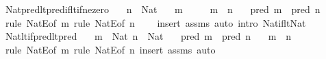 \begin{isabellebody}
\ Nat{\isacharunderscore}{\kern0pt}pred{\isacharunderscore}{\kern0pt}lt{\isacharunderscore}{\kern0pt}pred{\isacharunderscore}{\kern0pt}if{\isacharunderscore}{\kern0pt}lt{\isacharunderscore}{\kern0pt}if{\isacharunderscore}{\kern0pt}ne{\isacharunderscore}{\kern0pt}zero{\isacharcolon}{\kern0pt}\isanewline
\ \ \ {\isachardoublequoteopen}n\ {\isacharcolon}{\kern0pt}\ Nat{\isachardoublequoteclose}\isanewline
\ \ \ {\isachardoublequoteopen}m\ {\isasymnoteq}\ {}{\isachardoublequoteclose}\isanewline
\ \ \ {\isachardoublequoteopen}m\ {\isacharless}{\kern0pt}\ n{\isachardoublequoteclose}\isanewline
\ \ \ {\isachardoublequoteopen}pred\ m\ {\isacharless}{\kern0pt}\ pred\ n{\isachardoublequoteclose}\isanewline
%
\isadelimproof
\ \ %
\endisadelimproof
%
\isatagproof
{}\isamarkupfalse%
\ {\isacharparenleft}{\kern0pt}rule\ NatE{\isacharbrackleft}{\kern0pt}of\ m{\isacharbrackright}{\kern0pt}{\isacharsemicolon}{\kern0pt}\ rule\ NatE{\isacharbrackleft}{\kern0pt}of\ n{\isacharbrackright}{\kern0pt}{\isacharparenright}{\kern0pt}\isanewline
\ \ \ \ {\isacharparenleft}{\kern0pt}insert\ assms{\isacharcomma}{\kern0pt}\ auto\ intro{\isacharcolon}{\kern0pt}\ Nat{\isacharunderscore}{\kern0pt}if{\isacharunderscore}{\kern0pt}lt{\isacharunderscore}{\kern0pt}Nat{\isacharparenright}{\kern0pt}%
\endisatagproof
{\isafoldproof}%
%
\isadelimproof
\isanewline
%
\endisadelimproof
\isanewline
{}\isamarkupfalse%
\ Nat{\isacharunderscore}{\kern0pt}lt{\isacharunderscore}{\kern0pt}if{\isacharunderscore}{\kern0pt}pred{\isacharunderscore}{\kern0pt}lt{\isacharunderscore}{\kern0pt}pred{\isacharcolon}{\kern0pt}\isanewline
\ \ \ {\isachardoublequoteopen}m\ {\isacharcolon}{\kern0pt}\ Nat{\isachardoublequoteclose}\ {\isachardoublequoteopen}n\ {\isacharcolon}{\kern0pt}\ Nat{\isachardoublequoteclose}\isanewline
\ \ \ {\isachardoublequoteopen}pred\ m\ {\isacharless}{\kern0pt}\ pred\ n{\isachardoublequoteclose}\isanewline
\ \ \ {\isachardoublequoteopen}m\ {\isacharless}{\kern0pt}\ n{\isachardoublequoteclose}\isanewline
%
\isadelimproof
\ \ %
\endisadelimproof
%
\isatagproof
{}\isamarkupfalse%
\ {\isacharparenleft}{\kern0pt}rule\ NatE{\isacharbrackleft}{\kern0pt}of\ m{\isacharbrackright}{\kern0pt}{\isacharsemicolon}{\kern0pt}\ rule\ NatE{\isacharbrackleft}{\kern0pt}of\ n{\isacharbrackright}{\kern0pt}{\isacharparenright}{\kern0pt}\ {\isacharparenleft}{\kern0pt}insert\ assms{\isacharcomma}{\kern0pt}\ auto{\isacharparenright}{\kern0pt}%
\endisatagproof

\end{isabellebody}
